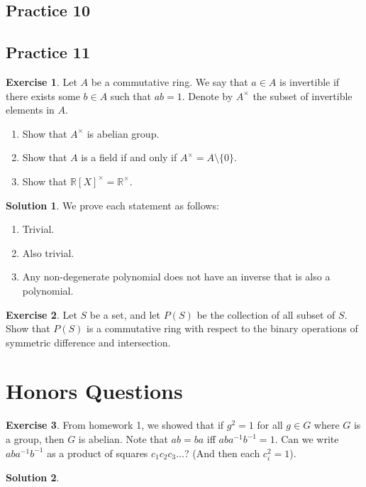 \documentclass[12pt]{article}
\theoremstyle{definition}
\newcommand{\R}{\mathbb{R}}
\newtheorem{exercise}{\color{YellowOrange}Exercise}
\theoremstyle{definition}
\newtheorem{solution}{\color{Goldenrod}Solution}
\begin{document}
\subsection{Practice 10}

\subsection{Practice 11}
\begin{exercise}
	Let $A$ be a commutative ring. We say that $a \in A$ is invertible if there exists some $b \in A$ such that $ab = 1$. Denote by $A^{\times}$ the subset of invertible elements in $A$. 
	\begin{enumerate}
		\item Show that $A^{\times}$ is abelian group.
		\item Show that $A$ is a field if and only if $A^{\times} = A \setminus \{0\}$.
		\item Show that $\R[X]^{\times} = \R^{\times}$.
	\end{enumerate}
\end{exercise}
\begin{solution}
We prove each statement as follows:
\begin{enumerate}
	\item Trivial.
	\item Also trivial.
	\item Any non-degenerate polynomial does not have an inverse that is also a polynomial.
\end{enumerate}
\end{solution}

\begin{exercise}
	Let $S$ be a set, and let $P(S)$ be the collection of all subset of $S$. Show that $P(S)$ is a commutative ring with respect to the binary operations of symmetric difference and intersection. 
\end{exercise}

\section{Honors Questions}
\begin{exercise}
From homework 1, we showed that if $g^2 = 1$ for all $g \in G$ where $G$ is a group, then $G$ is abelian. Note that $ab = ba$ iff $aba^{-1}b^{-1} = 1$. Can we write $aba^{-1}b^{-1}$ as a product of squares $c_1 c_2 c_3 \ldots $? (And then each $c^2_i = 1$).
\end{exercise}
\begin{solution}

\end{solution}
\end{document}
